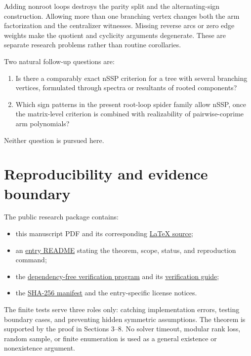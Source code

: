 \documentclass[11pt]{article}
\theoremstyle{remark}
\begin{document}
Adding nonroot loops destroys the parity split and the alternating-sign construction. Allowing more than one branching vertex changes both the arm factorization and the centralizer witnesses. Missing reverse arcs or zero edge weights make the quotient and cyclicity arguments degenerate. These are separate research problems rather than routine corollaries.

Two natural follow-up questions are:

\begin{enumerate}
\item Is there a comparably exact nSSP criterion for a tree with several branching vertices, formulated through spectra or resultants of rooted components?
\item Which sign patterns in the present root-loop spider family allow nSSP, once the matrix-level criterion is combined with realizability of pairwise-coprime arm polynomials?

\end{enumerate}

Neither question is pursued here.

\section{Reproducibility and evidence boundary}

The public research package contains:

\begin{itemize}
\item this manuscript PDF and its corresponding \href{nssp-root-loop-spiders.tex}{LaTeX source};
\item an \href{README.md}{entry README} stating the theorem, scope, status, and reproduction command;
\item the \href{verification/verify_directed_spider_criterion.py}{dependency-free verification program} and its \href{verification/README.md}{verification guide};
\item the \href{SHA256SUMS.txt}{SHA-256 manifest} and the entry-specific license notices.

\end{itemize}

The finite tests serve three roles only: catching implementation errors, testing boundary cases, and preventing hidden symmetric assumptions. The theorem is supported by the proof in Sections 3--8. No solver timeout, modular rank loss, random sample, or finite enumeration is used as a general existence or nonexistence argument.
\end{document}
